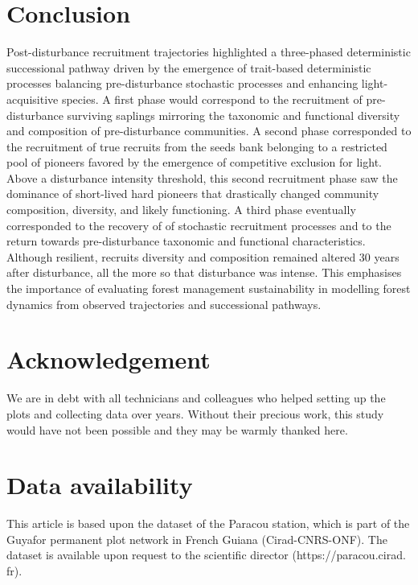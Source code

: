 \documentclass[fleqn,10pt]{ArtEcoFoG} %
\begin{document}
\section{Conclusion}\label{conclusion}

Post-disturbance recruitment trajectories highlighted a three-phased
deterministic successional pathway driven by the emergence of
trait-based deterministic processes balancing pre-disturbance stochastic
processes and enhancing light-acquisitive species. A first phase would
correspond to the recruitment of pre-disturbance surviving saplings
mirroring the taxonomic and functional diversity and composition of
pre-disturbance communities. A second phase corresponded to the
recruitment of true recruits from the seeds bank belonging to a
restricted pool of pioneers favored by the emergence of competitive
exclusion for light. Above a disturbance intensity threshold, this
second recruitment phase saw the dominance of short-lived hard pioneers
that drastically changed community composition, diversity, and likely
functioning. A third phase eventually corresponded to the recovery of of
stochastic recruitment processes and to the return towards
pre-disturbance taxonomic and functional characteristics. Although
resilient, recruits diversity and composition remained altered 30 years
after disturbance, all the more so that disturbance was intense. This
emphasises the importance of evaluating forest management sustainability
in modelling forest dynamics from observed trajectories and successional
pathways.

\section{Acknowledgement}\label{acknowledgement}

We are in debt with all technicians and colleagues who helped setting up
the plots and collecting data over years. Without their precious work,
this study would have not been possible and they may be warmly thanked
here.

\section{Data availability}\label{data-availability}

This article is based upon the dataset of the Paracou station, which is
part of the Guyafor permanent plot network in French Guiana
(Cirad-CNRS-ONF). The dataset is available upon request to the
scientific director (https://paracou.cirad. fr).
\end{document}

